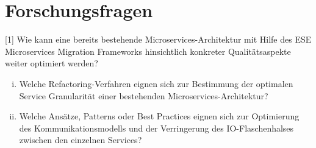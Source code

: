 \chapter{Forschungsfragen}
\label{chap:forschungsfragen}

[1] Wie kann eine bereits bestehende Microservices-Architektur mit Hilfe des ESE Microservices Migration Frameworks hinsichtlich konkreter Qualitätsaspekte weiter optimiert werden?
\begin{enumerate}[i.]
	\item Welche Refactoring-Verfahren eignen sich zur Bestimmung der optimalen Service Granularität einer bestehenden Microservices-Architektur?
	\item Welche Ansätze, Patterns oder Best Practices eignen sich zur Optimierung des Kommunikationsmodells und der Verringerung des IO-Flaschenhalses zwischen den einzelnen Services?
\end{enumerate}
